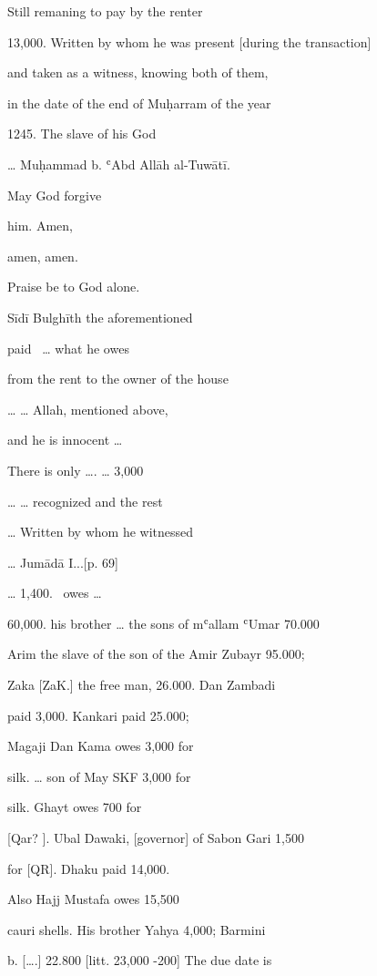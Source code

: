 \documentclass[12pt]{article}
\begin{document}
\begin{pages}
\begin{Rightside}
Still remaning to pay by the renter

13,000. Written by whom he was present [during the transaction]

and taken as a witness, knowing both of them,

in the date of the end of Muḥarram of the year

1245. The slave of his God

{\dots} Muḥammad b. ʿAbd Allāh al-Tuwātī.

May God forgive

him. Amen,

amen, amen.


Praise be to God alone.

Sīdī Bulghīth the aforementioned

paid \ {\dots} what he owes

from the rent to the owner of the house

{\dots} {\dots} Allah, mentioned above,

and he is innocent {\dots}

There is only {\dots}. {\dots} 3,000

{\dots} {\dots} recognized and the rest

{\dots} Written by whom he witnessed

{\dots} Jumādā I...[p. 69]


{\dots} 1,400. \ owes {\dots}

60,000. his brother {\dots} the sons of mʿallam ʿUmar 70.000

Arim the slave of the son of the Amir Zubayr 95.000;

Zaka [ZaK.] the free man, 26.000. Dan Zambadi

paid 3,000. Kankari paid 25.000;

Magaji Dan Kama owes 3,000 for

silk. {\dots} son of May SKF 3,000 for

silk. Ghayt owes 700 for

[Qar? ]. Ubal Dawaki, [governor] of Sabon Gari 1,500

for [QR]. Dhaku paid 14,000.


Also Hajj Mustafa owes 15,500

cauri shells. His brother Yahya 4,000;  Barmini

b. [{\dots}.] 22.800 [litt. 23,000 -200] The due date is


\end{Rightside}
\end{pages}
\end{document}

